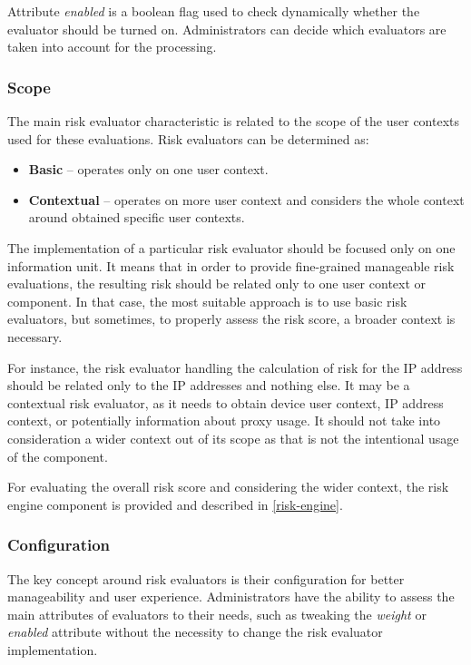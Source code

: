 Attribute \textit{enabled} is a boolean flag used to check dynamically whether
the evaluator should be turned on.
Administrators can decide which evaluators are taken into account for the processing.

\subsubsection{Scope}
The main risk evaluator characteristic is related to the scope of the user contexts used for these evaluations.
\newline
\newline
Risk evaluators can be determined as:

\begin{itemize}
    \item \textbf{Basic} -- operates only on one user context.
    \item \textbf{Contextual} -- operates on more user context and considers the whole context around obtained specific user contexts.
\end{itemize}

The implementation of a particular risk evaluator should be focused only on one information unit.
It means that in order to provide fine-grained manageable risk evaluations, the resulting risk should be related only to one user context or component.
In that case, the most suitable approach is to use basic risk evaluators, but sometimes, to properly assess the risk score, a broader context is necessary.

For instance, the risk evaluator handling the calculation of risk for the IP address should be related only to the IP addresses and nothing else.
It may be a contextual risk evaluator, as it needs to obtain device user context, IP address context, or potentially information about proxy usage.
It should not take into consideration a wider context out of its scope as that is not the intentional usage of the component.

For evaluating the overall risk score and considering the wider context, the risk engine component is provided and described in \ref{risk-engine}.

\newpage

\subsubsection{Configuration} \label{design-risk-eval-config}
The key concept around risk evaluators is their configuration for better manageability and user experience.
Administrators have the ability to assess the main attributes of evaluators to their needs, such as tweaking the \textit{weight} or \textit{enabled} attribute without the necessity to change the risk evaluator implementation.

